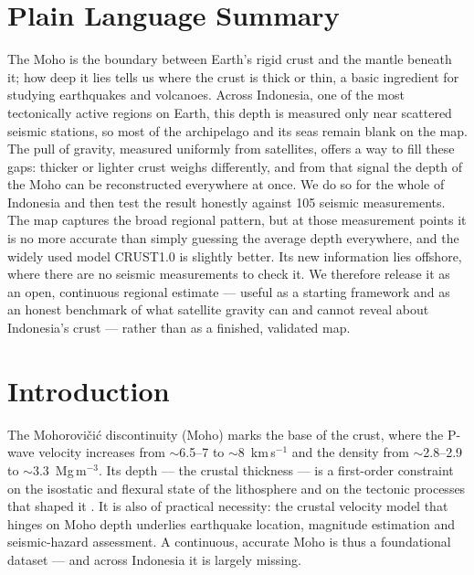 \documentclass{agujournal2019}
\begin{document}
\section*{Plain Language Summary}
The Moho is the boundary between Earth's rigid crust and the mantle beneath it; how
deep it lies tells us where the crust is thick or thin, a basic ingredient for
studying earthquakes and volcanoes. Across Indonesia, one of the most tectonically
active regions on Earth, this depth is measured only near scattered seismic
stations, so most of the archipelago and its seas remain blank on the map. The pull
of gravity, measured uniformly from satellites, offers a way to fill these gaps:
thicker or lighter crust weighs differently, and from that signal the depth of the
Moho can be reconstructed everywhere at once. We do so for the whole of Indonesia
and then test the result honestly against 105 seismic measurements. The map captures
the broad regional pattern, but at those measurement points it is no more accurate
than simply guessing the average depth everywhere, and the widely used model CRUST1.0
is slightly better. Its new information lies offshore, where there are no seismic
measurements to check it. We therefore release it as an open, continuous regional
estimate --- useful as a starting framework and as an honest benchmark of what
satellite gravity can and cannot reveal about Indonesia's crust --- rather than as a
finished, validated map.

\section{Introduction}
The Mohorovi\v{c}i\'{c} discontinuity (Moho) marks the base of the crust, where
the P-wave velocity increases from $\sim$6.5--7 to $\sim$8~km\,s$^{-1}$ and the
density from $\sim$2.8--2.9 to $\sim$3.3~Mg\,m$^{-3}$. Its depth --- the crustal
thickness --- is a first-order constraint on the isostatic and flexural state of
the lithosphere and on the tectonic processes that shaped it \cite{watts2001}. It
is also of practical necessity: the crustal velocity model that hinges on Moho
depth underlies earthquake location, magnitude estimation and seismic-hazard
assessment. A continuous, accurate Moho is thus a foundational dataset --- and
across Indonesia it is largely missing.
\end{document}
